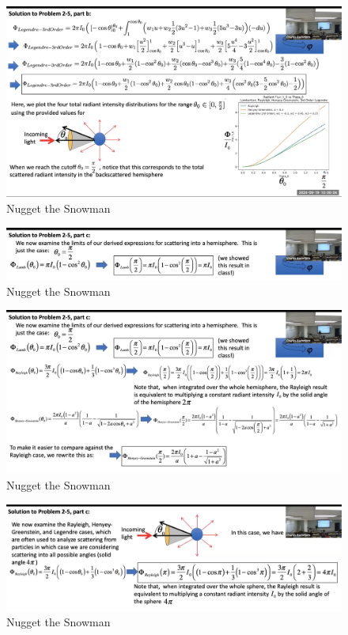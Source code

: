 \documentclass{article}
\begin{document}
\begin{figure}[h!]
\centering
\includegraphics[scale=.2]{Radiometry/Week4/Notes/PSET2/P5/Num4.png}
\caption{Nugget the Snowman}
\label{fig:Greenstein}
\end{figure}
\begin{figure}[h!]
\centering
\includegraphics[scale=.2]{Radiometry/Week4/Notes/PSET2/P5/Num5.png}
\caption{Nugget the Snowman}
\label{fig:Greenstein}
\end{figure}


\begin{figure}[h!]
\centering
\includegraphics[scale=.2]{Radiometry/Week4/Notes/PSET2/P5/Num6.png}
\caption{Nugget the Snowman}
\label{fig:Greenstein}
\end{figure}

\begin{figure}[h!]
\centering
\includegraphics[scale=.2]{Radiometry/Week4/Notes/PSET2/P5/Num7.png}
\caption{Nugget the Snowman}
\label{fig:Greenstein}
\end{figure}
\end{document}
